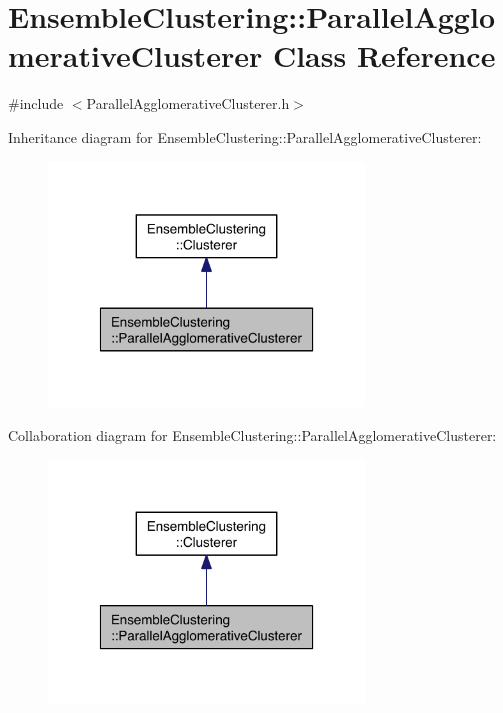 \hypertarget{class_ensemble_clustering_1_1_parallel_agglomerative_clusterer}{\section{Ensemble\-Clustering\-:\-:Parallel\-Agglomerative\-Clusterer Class Reference}
\label{class_ensemble_clustering_1_1_parallel_agglomerative_clusterer}
}


{\ttfamily \#include $<$Parallel\-Agglomerative\-Clusterer.\-h$>$}



Inheritance diagram for Ensemble\-Clustering\-:\-:Parallel\-Agglomerative\-Clusterer\-:
\nopagebreak
\begin{figure}[H]
\begin{center}
\leavevmode
\includegraphics[width=238pt]{class_ensemble_clustering_1_1_parallel_agglomerative_clusterer__inherit__graph}
\end{center}
\end{figure}


Collaboration diagram for Ensemble\-Clustering\-:\-:Parallel\-Agglomerative\-Clusterer\-:
\nopagebreak
\begin{figure}[H]
\begin{center}
\leavevmode
\includegraphics[width=238pt]{class_ensemble_clustering_1_1_parallel_agglomerative_clusterer__coll__graph}
\end{center}
\end{figure}
